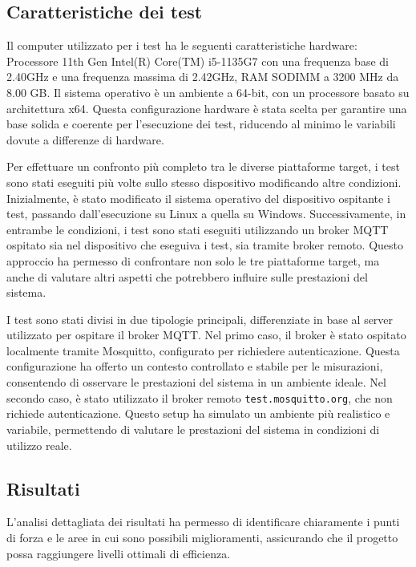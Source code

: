 \documentclass[12pt,a4paper,openright,twoside]{book}
\begin{document}
\subsection{Caratteristiche dei test}

Il computer utilizzato per i test ha le seguenti caratteristiche hardware: Processore 11th Gen Intel(R) Core(TM) i5-1135G7 con una frequenza base di 2.40GHz e una 
frequenza massima di 2.42GHz, RAM SODIMM a 3200 MHz da 8.00 GB. Il sistema operativo è un ambiente a 64-bit, con un processore basato su architettura x64. 
Questa configurazione hardware è stata scelta per garantire una base solida e coerente per l'esecuzione dei test, riducendo al minimo le variabili dovute a differenze di hardware. 

Per effettuare un confronto più completo tra le diverse piattaforme target, i test sono stati eseguiti più volte sullo stesso dispositivo modificando altre condizioni. 
Inizialmente, è stato modificato il sistema operativo del dispositivo ospitante i test, passando dall'esecuzione su Linux a quella su Windows. 
Successivamente, in entrambe le condizioni, i test sono stati eseguiti utilizzando un broker \ac{MQTT} ospitato sia nel dispositivo che eseguiva i test, sia tramite broker remoto.  
Questo approccio ha permesso di confrontare non solo le tre piattaforme target, ma anche di valutare altri aspetti che potrebbero influire sulle prestazioni del sistema.

I test sono stati divisi in due tipologie principali, differenziate in base al server utilizzato per ospitare il broker \ac{MQTT}. Nel primo caso, il broker è stato ospitato 
localmente tramite Mosquitto, configurato per richiedere autenticazione. Questa configurazione ha offerto un contesto controllato e stabile per le misurazioni, consentendo 
di osservare le prestazioni del sistema in un ambiente ideale. Nel secondo caso, è stato utilizzato il broker remoto \texttt{test.mosquitto.org}, che non richiede autenticazione. 
Questo setup ha simulato un ambiente più realistico e variabile, permettendo di valutare le prestazioni del sistema in condizioni di utilizzo reale.

\pagebreak
\subsection{Risultati}

L'analisi dettagliata dei risultati ha permesso di identificare chiaramente i punti di forza e le aree in cui sono possibili miglioramenti, 
assicurando che il progetto possa raggiungere livelli ottimali di efficienza.
\end{document}
